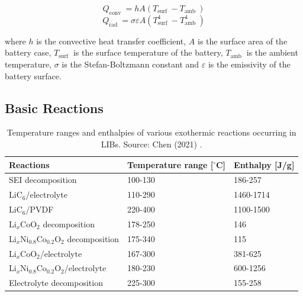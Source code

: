 \begin{equation}
    \label{eq:convection-heat}
    Q_{\text {conv }}=h A\left(T_{\text {surf }}-T_{\text {amb }}\right)
\end{equation}
\begin{equation}
    \label{eq:radiation-heat}
    Q_{\text {rad }}=\sigma \varepsilon A\left(T_{\text {surf }}^{4}-T_{\text {amb }}^{4}\right)
\end{equation}

where $h$ is the convective heat transfer coefficient, $A$ is the surface area of the battery case, $T_{\text {surf }}$ is the surface temperature of the battery, $T_{\text {amb }}$ is the ambient temperature, $\sigma$ is the Stefan-Boltzmann constant and $\varepsilon$ is the emissivity of the battery surface.

\subsection{Basic Reactions}
\label{sec:basic-reactions}
\begin{table}[ht]
    \centering
    \begin{footnotesize}
        \begin{tabular}{|P{55mm} P{28mm} P{20mm}|}
            \hline
            \vspace{0.1mm}\textbf{Reactions} & \textbf{Temperature range [$^\circ$C]} & \textbf{Enthalpy [J/g]}\T\B \\
            \hline \hline

            SEI decomposition & 100-130 & 186-257\T\B\\

            LiC$_6$/electrolyte & 110-290 & 1460-1714\T\B\\

            LiC$_6$/PVDF & 220-400 & 1100-1500\T\B\\

            Li$_x$CoO$_2$ decomposition & 178-250 & 146\T\B\\

            Li$_x$Ni$_{0.8}$Co$_{0.2}$O$_2$ decomposition & 175-340 & 115\T\B\\

            Li$_x$CoO$_2$/electrolyte & 167-300 & 381-625\T\B\\

            Li$_x$Ni$_{0.8}$Co$_{0.2}$O$_2$/electrolyte & 180-230 & 600-1256\T\B\\

            Electrolyte decomposition & 225-300 & 155-258\T\B\\
            \hline
        \end{tabular}
        \\[10pt]
        \caption[Exothermic reactions occurring in LIBs]{Temperature ranges and enthalpies of various exothermic reactions occurring in LIBs. Source: Chen (2021) \cite{chen2021review}.}
        \label{table:reactions}
    \end{footnotesize}
\end{table}



